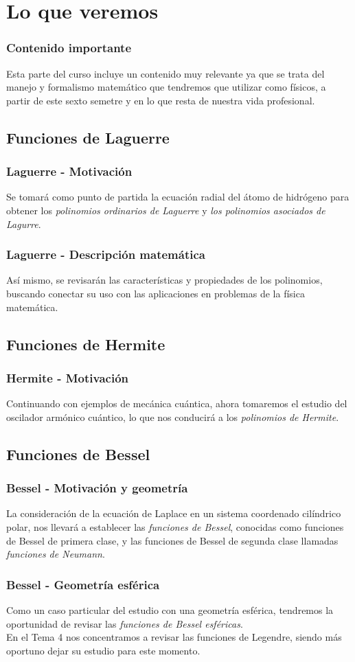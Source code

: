\section{Lo que veremos}
\begin{frame}
\frametitle{Contenido importante}
Esta parte del curso incluye un contenido muy relevante ya que se trata del manejo y formalismo matemático que tendremos que utilizar como físicos, a partir de este sexto semetre y en lo que resta de nuestra vida profesional.
\end{frame}
\subsection{Funciones de Laguerre}
\begin{frame}
\frametitle{Laguerre - Motivación}
Se tomará como punto de partida la ecuación radial del átomo de hidrógeno para obtener los \emph{polinomios ordinarios de Laguerre} y \emph{los polinomios asociados de Lagurre}.
\end{frame}
\begin{frame}
\frametitle{Laguerre - Descripción matemática}
Así mismo, se revisarán las características y propiedades de los polinomios, buscando conectar su uso con las aplicaciones en problemas de la física matemática.
\end{frame}
\subsection{Funciones de Hermite}
\begin{frame}
\frametitle{Hermite - Motivación}
Continuando con ejemplos de mecánica cuántica, ahora tomaremos el estudio del oscilador armónico cuántico, lo que nos conducirá a los \emph{polinomios de Hermite}.
\end{frame}
\subsection{Funciones de Bessel}
\begin{frame}
\frametitle{Bessel - Motivación y geometría}
La consideración de la ecuación de Laplace en un sistema coordenado cilíndrico polar, nos llevará a establecer las \emph{funciones de Bessel}, conocidas como funciones de Bessel de primera clase, y las funciones de Bessel de segunda clase llamadas \emph{funciones de Neumann}.
\end{frame}
\begin{frame}
\frametitle{Bessel - Geometría esférica}
Como un caso particular del estudio con una geometría esférica, tendremos la oportunidad de revisar las \emph{funciones de Bessel esféricas}.
\\
\bigskip
En el Tema 4 nos concentramos a revisar las funciones de Legendre, siendo más oportuno dejar su estudio para este momento.
\end{frame}
